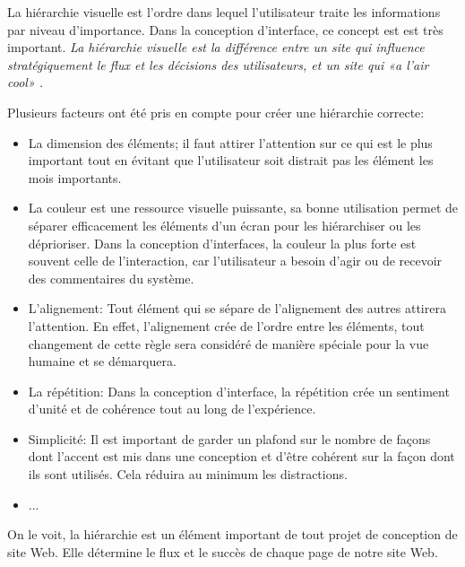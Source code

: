 La hiérarchie visuelle est l'ordre dans lequel l'utilisateur traite les informations par niveau d'importance.
Dans la conception d'interface, ce concept est est très important.
\textit{La hiérarchie visuelle est la différence entre un site qui influence stratégiquement le flux et les 
décisions des utilisateurs, et un site qui «a l'air cool» \cite{cao20155}.}
\par 
Plusieurs facteurs ont été pris en compte pour créer une hiérarchie correcte:
\begin{itemize}
        \item La dimension des éléments; il faut attirer l'attention sur ce qui est le plus important
        tout en évitant que l'utilisateur soit distrait pas les élément les mois importants.
        \item La couleur est une ressource visuelle puissante, sa bonne utilisation permet de séparer 
        efficacement les éléments d'un écran pour les hiérarchiser ou les déprioriser. Dans la 
        conception d’interfaces, la couleur la plus forte est souvent celle de l’interaction, 
        car l’utilisateur a besoin d’agir ou de recevoir des commentaires du système.
        \item L'alignement: Tout élément qui se sépare de l'alignement des autres attirera l'attention. 
        En effet, l'alignement crée de l'ordre entre les éléments, tout changement de cette règle sera 
        considéré de manière spéciale pour la vue humaine et se démarquera.
        \item La répétition: Dans la conception d'interface, la répétition crée un sentiment 
        d'unité et de cohérence tout au long de l'expérience.
        \item Simplicité: Il est important de garder un plafond sur le nombre de façons dont l'accent est
         mis dans une conception et d'être cohérent sur la façon dont ils sont utilisés. 
         Cela réduira au minimum les distractions.
        \item ...\cite{design}

\end{itemize}
On le voit, la hiérarchie est un élément important de tout projet de conception de site Web. 
Elle détermine le flux et le succès de chaque page de notre site Web.


